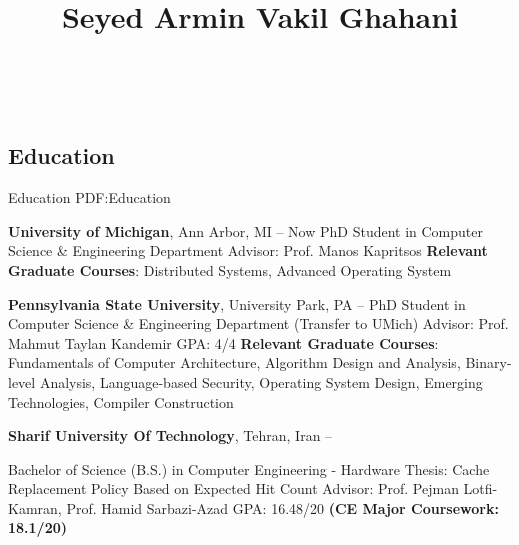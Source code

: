 \documentclass[a4paper,9pt,oneside]{article}
\newcommand{\CVAuthor}{Seyed Armin Vakil Ghahani}
\begin{document}

\title{\CVAuthor}
\begin{subtitle}

\Large{
\href{https://arminvakil.github.io/}{\faGlobe}
\href{mailto:arminvakil@gmail.com}{\faEnvelope}
\href{https://www.linkedin.com/in/arminvakil}{\faLinkedin}
\href{https://github.com/arminvakil}{\faGithubSquare}
\href{https://scholar.google.com/citations?user=OHnTCysAAAAJ&hl=en}{\faGraduationCap}}
\
\end{subtitle}

\begin{body}


\section
{Education}
{Education}
{PDF:Education}

\textbf{University of Michigan},
Ann Arbor, MI
\hfill
{} --
Now
\GapNoBreak
\BulletItem
PhD Student in
	Computer Science \& Engineering Department
\SubBulletItem
Advisor: Prof. Manos Kapritsos
\SubBulletItem
\textbf{Relevant Graduate Courses}: Distributed Systems, Advanced Operating System

\textbf{Pennsylvania State University},
University Park, PA
\hfill
{} --
\GapNoBreak
\BulletItem
PhD Student in
	Computer Science \& Engineering Department (Transfer to UMich)
\SubBulletItem
Advisor: Prof. Mahmut Taylan Kandemir
\SubBulletItem
GPA: 4/4
\SubBulletItem
\textbf{Relevant Graduate Courses}: Fundamentals of Computer Architecture, Algorithm Design and Analysis, Binary-level Analysis, Language-based Security, Operating System Design, Emerging Technologies, Compiler Construction

\BigGap

\textbf{Sharif University Of Technology},
Tehran, Iran
\hfill
{} --

\GapNoBreak
\BulletItem
Bachelor of Science (B.S.) in
Computer Engineering - Hardware
\SubBulletItem
Thesis: Cache Replacement Policy Based on Expected Hit Count
\newline
Advisor: Prof. Pejman Lotfi-Kamran, Prof. Hamid Sarbazi-Azad
\SubBulletItem
GPA: 16.48/20 \textbf{(CE Major Coursework: 18.1/20)}



\end{body}
\end{document}
